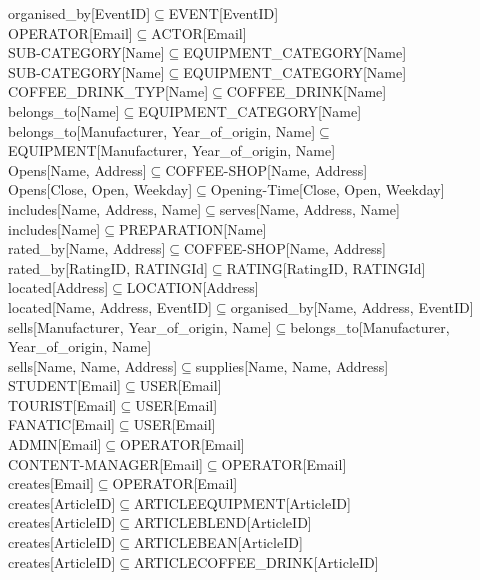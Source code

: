 organised\_by[EventID]$\subseteq$EVENT[EventID]\\
OPERATOR[Email]$\subseteq$ACTOR[Email]\\
SUB-CATEGORY[Name]$\subseteq$EQUIPMENT\_CATEGORY[Name]\\
SUB-CATEGORY[Name]$\subseteq$EQUIPMENT\_CATEGORY[Name]\\
COFFEE\_DRINK\_TYP[Name]$\subseteq$COFFEE\_DRINK[Name]\\
belongs\_to[Name]$\subseteq$EQUIPMENT\_CATEGORY[Name]\\
belongs\_to[Manufacturer, Year\_of\_origin, Name]$\subseteq$EQUIPMENT[Manufacturer, Year\_of\_origin, Name]\\
Opens[Name, Address]$\subseteq$COFFEE-SHOP[Name, Address]\\
Opens[Close, Open, Weekday]$\subseteq$Opening-Time[Close, Open, Weekday]\\
includes[Name, Address, Name]$\subseteq$serves[Name, Address, Name]\\
includes[Name]$\subseteq$PREPARATION[Name]\\
rated\_by[Name, Address]$\subseteq$COFFEE-SHOP[Name, Address]\\
rated\_by[RatingID, RATINGId]$\subseteq$RATING[RatingID, RATINGId]\\
located[Address]$\subseteq$LOCATION[Address]\\
located[Name, Address, EventID]$\subseteq$organised\_by[Name, Address, EventID]\\
sells[Manufacturer, Year\_of\_origin, Name]$\subseteq$belongs\_to[Manufacturer, Year\_of\_origin, Name]\\
sells[Name, Name, Address]$\subseteq$supplies[Name, Name, Address]\\
STUDENT[Email]$\subseteq$USER[Email]\\
TOURIST[Email]$\subseteq$USER[Email]\\
FANATIC[Email]$\subseteq$USER[Email]\\
ADMIN[Email]$\subseteq$OPERATOR[Email]\\
CONTENT-MANAGER[Email]$\subseteq$OPERATOR[Email]\\
creates[Email]$\subseteq$OPERATOR[Email]\\
creates[ArticleID]$\subseteq$ARTICLEEQUIPMENT[ArticleID]\\
creates[ArticleID]$\subseteq$ARTICLEBLEND[ArticleID]\\
creates[ArticleID]$\subseteq$ARTICLEBEAN[ArticleID]\\
creates[ArticleID]$\subseteq$ARTICLECOFFEE\_DRINK[ArticleID]\\
